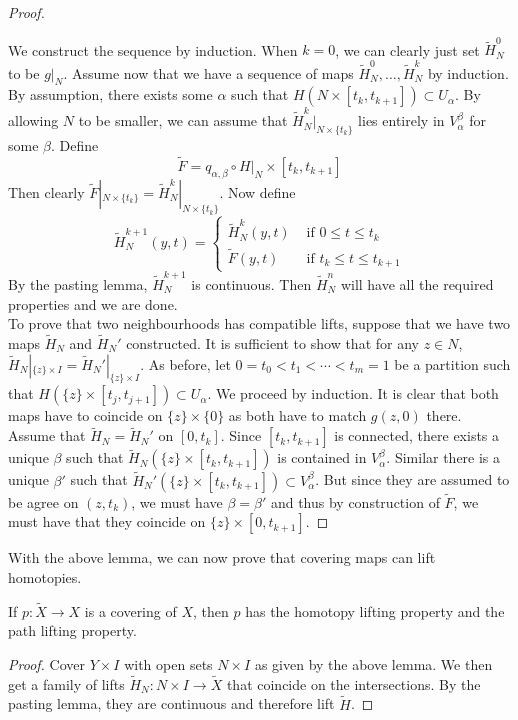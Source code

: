 \documentclass[a4paper]{article}
\begin{document}
\begin{lmm}{}{}
\begin{proof}
\begin{itemize}
\end{itemize}
We construct the sequence by induction. When $k=0$, we can clearly just set $\widetilde{H}_N^0$ to be $g|_N$. Assume now that we have a sequence of maps $\widetilde{H}_N^0,\dots,\widetilde{H}_N^k$ by induction. By assumption, there exists some $\alpha$ such that $H(N\times[t_k,t_{k+1}])\subset U_\alpha$. By allowing $N$ to be smaller, we can assume that $\widetilde{H}_N^k|_{N\times\{t_k\}}$ lies entirely in $V_\alpha^\beta$ for some $\beta$. Define $$\widetilde{F}=q_{\alpha,\beta}\circ H|_N\times[t_k,t_{k+1}]$$ Then clearly $\widetilde{F}|_{N\times\{t_k\}}=\widetilde{H}_N^k|_{N\times\{t_k\}}$. Now define $$\widetilde{H}_N^{k+1}(y,t)=\begin{cases}
\widetilde{H}_N^k(y,t) & \text{ if }0\leq t\leq t_k\\
\widetilde{F}(y,t) & \text{ if } t_k\leq t\leq t_{k+1}
\end{cases}$$
By the pasting lemma, $\widetilde{H}_N^{k+1}$ is continuous. Then $\widetilde{H}_N^n$ will have all the required properties and we are done. \\
To prove that two neighbourhoods has compatible lifts, suppose that we have two maps $\widetilde{H}_N$ and $\widetilde{H}_N'$ constructed. It is sufficient to show that for any $z\in N$, $\widetilde{H}_N|_{\{z\}\times I}=\widetilde{H}_N'|_{\{z\}\times I}$. As before, let $0=t_0<t_1<\cdots<t_m=1$ be a partition such that $H(\{z\}\times[t_j,t_{j+1}])\subset U_\alpha$. We proceed by induction. It is clear that both maps have to coincide on $\{z\}\times\{0\}$ as both have to match $g(z,0)$ there. Assume that $\widetilde{H}_N=\widetilde{H}_N'$ on $[0,t_k]$. Since $[t_k,t_{k+1}]$ is connected, there exists a unique $\beta$ such that $\widetilde{H}_N(\{z\}\times[t_k,t_{k+1}])$ is contained in $V_\alpha^\beta$. Similar there is a unique $\beta'$ such that $\widetilde{H}_N'(\{z\}\times[t_k,t_{k+1}])\subset V_\alpha^\beta$. But since they are assumed to be agree on $(z,t_k)$, we must have $\beta=\beta'$ and thus by construction of $\widetilde{F}$, we must have that they coincide on $\{z\}\times[0,t_{k+1}]$. 
\end{proof}
\end{lmm}

With the above lemma, we can now prove that covering maps can lift homotopies. 

\begin{thm}{}{} If $p:\widetilde{X}\to X$ is a covering of $X$, then $p$ has the homotopy lifting property and the path lifting property. 
\begin{proof}
Cover $Y\times I$ with open sets $N\times I$ as given by the above lemma. We then get a family of lifts $\widetilde{H}_N:N\times I\to\widetilde{X}$ that coincide on the intersections. By the pasting lemma, they are continuous and therefore lift $\widetilde{H}$. 
\end{proof}
\end{thm}
\end{document}
